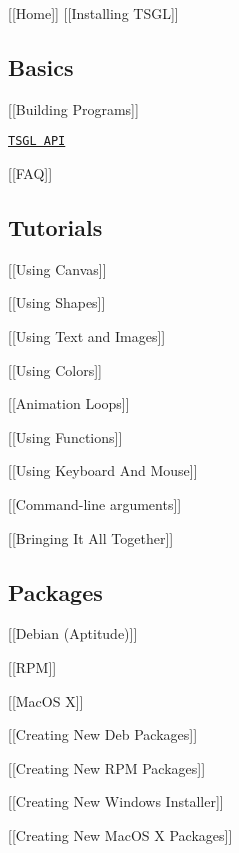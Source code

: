 \mbox{[}\mbox{[}Home\mbox{]}\mbox{]} \mbox{[}\mbox{[}Installing T\-S\-G\-L\mbox{]}\mbox{]}

\subsection*{Basics}


\begin{DoxyItemize}
\item \mbox{[}\mbox{[}Building Programs\mbox{]}\mbox{]}
\item \href{http://calvin-cs.github.io/TSGL/html/annotated.html}{\tt T\-S\-G\-L A\-P\-I}
\item \mbox{[}\mbox{[}F\-A\-Q\mbox{]}\mbox{]}
\end{DoxyItemize}

\subsection*{Tutorials}


\begin{DoxyItemize}
\item \mbox{[}\mbox{[}Using Canvas\mbox{]}\mbox{]}
\item \mbox{[}\mbox{[}Using Shapes\mbox{]}\mbox{]}
\item \mbox{[}\mbox{[}Using Text and Images\mbox{]}\mbox{]}
\item \mbox{[}\mbox{[}Using Colors\mbox{]}\mbox{]}
\item \mbox{[}\mbox{[}Animation Loops\mbox{]}\mbox{]}
\item \mbox{[}\mbox{[}Using Functions\mbox{]}\mbox{]}
\item \mbox{[}\mbox{[}Using Keyboard And Mouse\mbox{]}\mbox{]}
\item \mbox{[}\mbox{[}Command-\/line arguments\mbox{]}\mbox{]}
\item \mbox{[}\mbox{[}Bringing It All Together\mbox{]}\mbox{]}
\end{DoxyItemize}

\subsection*{Packages}


\begin{DoxyItemize}
\item \mbox{[}\mbox{[}Debian (Aptitude)\mbox{]}\mbox{]}
\item \mbox{[}\mbox{[}R\-P\-M\mbox{]}\mbox{]}
\item \mbox{[}\mbox{[}Mac\-O\-S X\mbox{]}\mbox{]}
\item \mbox{[}\mbox{[}Creating New Deb Packages\mbox{]}\mbox{]}
\item \mbox{[}\mbox{[}Creating New R\-P\-M Packages\mbox{]}\mbox{]}
\item \mbox{[}\mbox{[}Creating New Windows Installer\mbox{]}\mbox{]}
\item \mbox{[}\mbox{[}Creating New Mac\-O\-S X Packages\mbox{]}\mbox{]}
\end{DoxyItemize}

